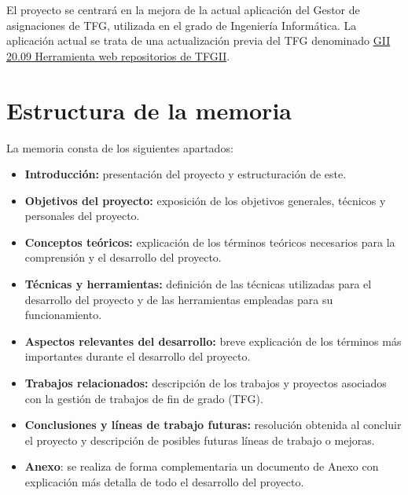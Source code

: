 
El proyecto se centrará en la mejora de la actual aplicación del Gestor de asignaciones de TFG, utilizada en el grado de Ingeniería Informática. La aplicación actual se trata de una actualización previa del TFG denominado \href{https://github.com/dbo1001/Gestor-TFG-2021}{GII 20.09 Herramienta web
repositorios de TFGII}. 



\section{Estructura de la memoria}
La memoria consta de los siguientes apartados:

\begin{itemize}
	\item \textbf{Introducción:} presentación del proyecto y estructuración de este.
	\item \textbf{Objetivos del proyecto:}  exposición de los  objetivos generales, técnicos y personales del proyecto.
	\item \textbf{Conceptos teóricos:} explicación de los términos teóricos necesarios para la comprensión y el desarrollo del proyecto.
	\item \textbf{Técnicas y herramientas:} definición de las técnicas utilizadas para el desarrollo del proyecto y de las herramientas empleadas para su funcionamiento.
	\item \textbf{Aspectos relevantes del desarrollo:} breve explicación de los términos más importantes durante el desarrollo del proyecto.
	\item \textbf{Trabajos relacionados:} descripción de los trabajos y proyectos asociados con la gestión de trabajos de fin de grado (TFG).
	\item \textbf{Conclusiones y líneas de trabajo futuras:} resolución obtenida al concluir el proyecto y descripción de posibles futuras líneas de trabajo o mejoras.
	\item \textbf{Anexo}: se realiza de forma complementaria un documento de Anexo con explicación más detalla de todo el desarrollo del proyecto.
\end{itemize}